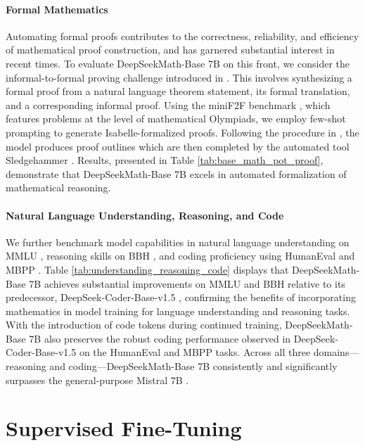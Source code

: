 \paragraph{Formal Mathematics}

Automating formal proofs contributes to the correctness, reliability, and efficiency of mathematical proof construction, and has garnered substantial interest in recent times. To evaluate DeepSeekMath-Base 7B on this front, we consider the informal-to-formal proving challenge introduced in \citep{dsp_proof}. This involves synthesizing a formal proof from a natural language theorem statement, its formal translation, and a corresponding informal proof. Using the miniF2F benchmark \citep{minif2f}, which features problems at the level of mathematical Olympiads, we employ few-shot prompting to generate Isabelle-formalized proofs. Following the procedure in \cite{dsp_proof}, the model produces proof outlines which are then completed by the automated tool Sledgehammer \citep{sledgehammer}. Results, presented in Table \ref{tab:base_math_pot_proof}, demonstrate that DeepSeekMath-Base 7B excels in automated formalization of mathematical reasoning.

\paragraph{Natural Language Understanding, Reasoning, and Code}

We further benchmark model capabilities in natural language understanding on MMLU \citep{mmlu}, reasoning skills on BBH \citep{bbh}, and coding proficiency using HumanEval \citep{codex} and MBPP \citep{mbpp}. Table \ref{tab:understanding_reasoning_code} displays that DeepSeekMath-Base 7B achieves substantial improvements on MMLU and BBH relative to its predecessor, DeepSeek-Coder-Base-v1.5 \citep{deepseek-coder}, confirming the benefits of incorporating mathematics in model training for language understanding and reasoning tasks. With the introduction of code tokens during continued training, DeepSeekMath-Base 7B also preserves the robust coding performance observed in DeepSeek-Coder-Base-v1.5 on the HumanEval and MBPP tasks. Across all three domains—reasoning and coding—DeepSeekMath-Base 7B consistently and significantly surpasses the general-purpose Mistral 7B \citep{mistral}.

\section{Supervised Fine-Tuning}

